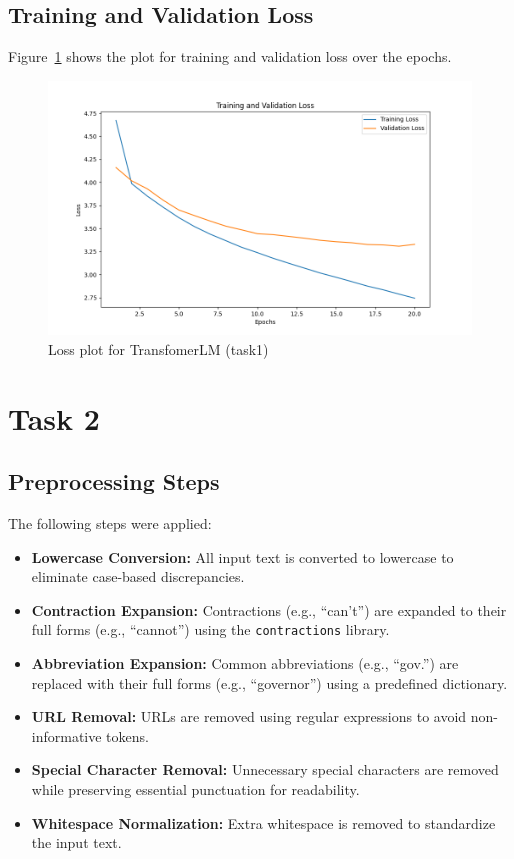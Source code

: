 \documentclass{article}
\begin{document}
\subsection{Training and Validation Loss}
Figure~\ref{fig:Fig1} shows the plot for training and validation loss over the epochs.

\begin{figure}[H]
    \centering
    \includegraphics[width=1\textwidth]{loss-plot.png}
    \caption{Loss plot for TransfomerLM (task1)}
    \label{fig:Fig1}
\end{figure}

\section{Task 2}
\subsection{Preprocessing Steps}
The following steps were applied:
\begin{itemize}
    \item \textbf{Lowercase Conversion:} All input text is converted to lowercase to eliminate case-based discrepancies.
    \item \textbf{Contraction Expansion:} Contractions (e.g., ``can't'') are expanded to their full forms (e.g., ``cannot'') using the \texttt{contractions} library.
    \item \textbf{Abbreviation Expansion:} Common abbreviations (e.g., ``gov.'') are replaced with their full forms (e.g., ``governor'') using a predefined dictionary.
    \item \textbf{URL Removal:} URLs are removed using regular expressions to avoid non-informative tokens.
    \item \textbf{Special Character Removal:} Unnecessary special characters are removed while preserving essential punctuation for readability.
    \item \textbf{Whitespace Normalization:} Extra whitespace is removed to standardize the input text.
\end{itemize}
\end{document}
